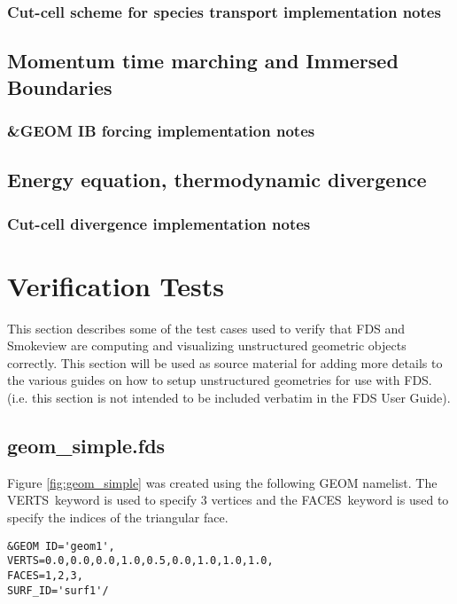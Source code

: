 \documentclass[12pt]{article}
\begin{document}
\subsubsection{Cut-cell scheme for species transport implementation notes}


\subsection{Momentum time marching and Immersed Boundaries}


\subsubsection{\&GEOM IB forcing implementation notes}


\subsection{Energy equation, thermodynamic divergence}


\subsubsection{Cut-cell divergence implementation notes}





\section{Verification Tests}

This section describes some of the test cases used to verify that FDS and Smokeview are computing
and visualizing unstructured geometric objects correctly.  This section will be used as source material for adding
more details to the various guides on how to setup unstructured geometries for use with FDS. (i.e. this section
is not intended to be included verbatim in the FDS User Guide).

\newcommand{\figheightD}{2.75in}

\subsection{geom\_simple.fds}
Figure \ref{fig:geom_simple} was created using the following GEOM namelist.
The {\ct VERTS}\ keyword is used to specify 3 vertices and the {\ct FACES}\ keyword
is used to specify the indices of the triangular face.

{\small
\begin{verbatim}
&GEOM ID='geom1',
VERTS=0.0,0.0,0.0,1.0,0.5,0.0,1.0,1.0,1.0,
FACES=1,2,3,
SURF_ID='surf1'/
\end{verbatim}
}
\end{document}
